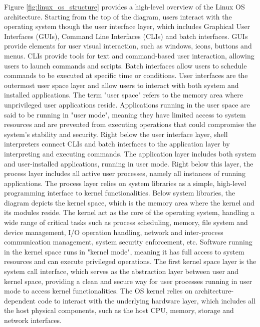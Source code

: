 Figure \ref{fig:linux_os_structure} provides a high-level overview of the Linux OS architecture.
Starting from the top of the diagram, users interact with the operating system though the user interface layer, which includes Graphical User Interfaces (GUIs), Command Line Interfaces (CLIs) and batch interfaces. GUIs provide elements for user visual interaction, such as windows, icons, buttons and menus. CLIs provide tools for text and command-based user interaction, allowing users to launch commands and scripts. Batch interfaces allow users to schedule commands to be executed at specific time or conditions.
User interfaces are the outermost user space layer and allow users to interact with both system and installed applications.
The term "user space" refers to the memory area where unprivileged user applications reside. 
Applications running in the user space are said to be running in "user mode", meaning they have limited access to system resources and are prevented from executing operations that could compromise the system's stability and security. \newline
Right below the user interface layer, shell interpreters connect CLIs and batch interfaces to the application layer by interpreting and executing commands.
The application layer includes both system and user-installed applications, running in user mode. Right below this layer, the process layer includes all active user processes, namely all instances of running applications. 
The process layer relies on system libraries as a simple, high-level programming interface to kernel functionalities. 
Below system libraries, the diagram depicts the kernel space, which is the memory area where the kernel and its modules reside. The kernel act as the core of the operating system, handling a wide range of critical tasks such as process scheduling, memory, file system and device management, I/O operation handling, network and inter-process communication management, system security enforcement, etc.
Software running in the kernel space runs in "kernel mode", meaning it has full access to system resources and can execute privileged operations.
The first kernel space layer is the system call interface, which serves as the abstraction layer between user and kernel space, providing a clean and secure way for user processes running in user mode to access kernel functionalities.
The OS kernel relies on architecture-dependent code to interact with the underlying hardware layer, which includes all the host physical components, such as the host CPU, memory, storage and network interfaces.

